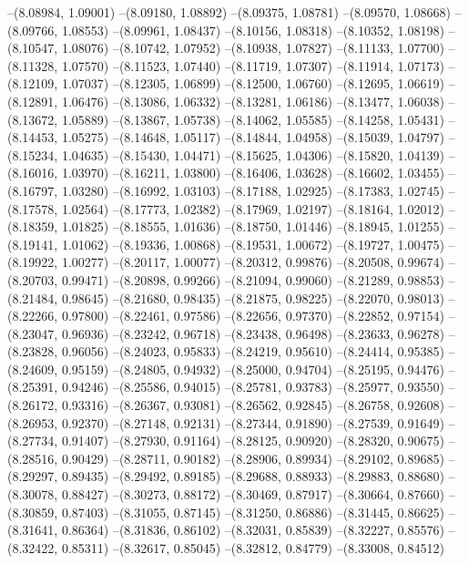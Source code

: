 --(8.08984, 1.09001)
--(8.09180, 1.08892)
--(8.09375, 1.08781)
--(8.09570, 1.08668)
--(8.09766, 1.08553)
--(8.09961, 1.08437)
--(8.10156, 1.08318)
--(8.10352, 1.08198)
--(8.10547, 1.08076)
--(8.10742, 1.07952)
--(8.10938, 1.07827)
--(8.11133, 1.07700)
--(8.11328, 1.07570)
--(8.11523, 1.07440)
--(8.11719, 1.07307)
--(8.11914, 1.07173)
--(8.12109, 1.07037)
--(8.12305, 1.06899)
--(8.12500, 1.06760)
--(8.12695, 1.06619)
--(8.12891, 1.06476)
--(8.13086, 1.06332)
--(8.13281, 1.06186)
--(8.13477, 1.06038)
--(8.13672, 1.05889)
--(8.13867, 1.05738)
--(8.14062, 1.05585)
--(8.14258, 1.05431)
--(8.14453, 1.05275)
--(8.14648, 1.05117)
--(8.14844, 1.04958)
--(8.15039, 1.04797)
--(8.15234, 1.04635)
--(8.15430, 1.04471)
--(8.15625, 1.04306)
--(8.15820, 1.04139)
--(8.16016, 1.03970)
--(8.16211, 1.03800)
--(8.16406, 1.03628)
--(8.16602, 1.03455)
--(8.16797, 1.03280)
--(8.16992, 1.03103)
--(8.17188, 1.02925)
--(8.17383, 1.02745)
--(8.17578, 1.02564)
--(8.17773, 1.02382)
--(8.17969, 1.02197)
--(8.18164, 1.02012)
--(8.18359, 1.01825)
--(8.18555, 1.01636)
--(8.18750, 1.01446)
--(8.18945, 1.01255)
--(8.19141, 1.01062)
--(8.19336, 1.00868)
--(8.19531, 1.00672)
--(8.19727, 1.00475)
--(8.19922, 1.00277)
--(8.20117, 1.00077)
--(8.20312, 0.99876)
--(8.20508, 0.99674)
--(8.20703, 0.99471)
--(8.20898, 0.99266)
--(8.21094, 0.99060)
--(8.21289, 0.98853)
--(8.21484, 0.98645)
--(8.21680, 0.98435)
--(8.21875, 0.98225)
--(8.22070, 0.98013)
--(8.22266, 0.97800)
--(8.22461, 0.97586)
--(8.22656, 0.97370)
--(8.22852, 0.97154)
--(8.23047, 0.96936)
--(8.23242, 0.96718)
--(8.23438, 0.96498)
--(8.23633, 0.96278)
--(8.23828, 0.96056)
--(8.24023, 0.95833)
--(8.24219, 0.95610)
--(8.24414, 0.95385)
--(8.24609, 0.95159)
--(8.24805, 0.94932)
--(8.25000, 0.94704)
--(8.25195, 0.94476)
--(8.25391, 0.94246)
--(8.25586, 0.94015)
--(8.25781, 0.93783)
--(8.25977, 0.93550)
--(8.26172, 0.93316)
--(8.26367, 0.93081)
--(8.26562, 0.92845)
--(8.26758, 0.92608)
--(8.26953, 0.92370)
--(8.27148, 0.92131)
--(8.27344, 0.91890)
--(8.27539, 0.91649)
--(8.27734, 0.91407)
--(8.27930, 0.91164)
--(8.28125, 0.90920)
--(8.28320, 0.90675)
--(8.28516, 0.90429)
--(8.28711, 0.90182)
--(8.28906, 0.89934)
--(8.29102, 0.89685)
--(8.29297, 0.89435)
--(8.29492, 0.89185)
--(8.29688, 0.88933)
--(8.29883, 0.88680)
--(8.30078, 0.88427)
--(8.30273, 0.88172)
--(8.30469, 0.87917)
--(8.30664, 0.87660)
--(8.30859, 0.87403)
--(8.31055, 0.87145)
--(8.31250, 0.86886)
--(8.31445, 0.86625)
--(8.31641, 0.86364)
--(8.31836, 0.86102)
--(8.32031, 0.85839)
--(8.32227, 0.85576)
--(8.32422, 0.85311)
--(8.32617, 0.85045)
--(8.32812, 0.84779)
--(8.33008, 0.84512)
